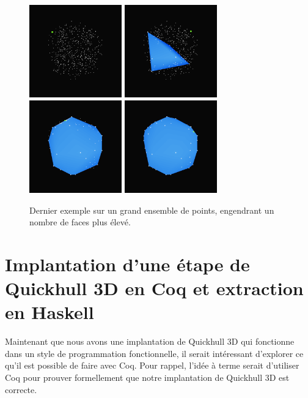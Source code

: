 \documentclass[]{article}
\begin{document}
\begin{figure}[H]
	\begin{center}
		\includegraphics[width=4cm]{qh3d/demo3d/main_0.png}
		\includegraphics[width=4cm]{qh3d/demo3d/main_1.png}
		\includegraphics[width=4cm]{qh3d/demo3d/main_2.png}
		\includegraphics[width=4cm]{qh3d/demo3d/main_3.png}
	\end{center}
	\caption{Dernier exemple sur un grand ensemble de points, engendrant un nombre de faces plus élevé.}
\end{figure}

\pagebreak
\section{Implantation d'une étape de Quickhull 3D en Coq et extraction en Haskell}
Maintenant que nous avons une implantation de Quickhull 3D qui fonctionne dans un style de programmation fonctionnelle, il serait intéressant d'explorer ce qu'il est possible de faire avec Coq. Pour rappel, l'idée à terme serait d'utiliser Coq pour prouver formellement que notre implantation de Quickhull 3D est correcte.
\end{document}
